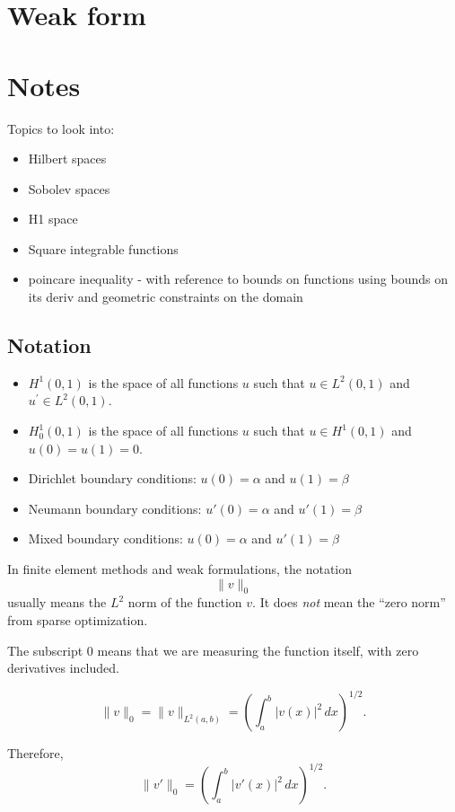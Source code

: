 \documentclass[../main.tex]{subfiles}
\begin{document}
\section{Weak form}

\section{Notes}
Topics to look into:
\begin{itemize}
    \item Hilbert spaces
    \item Sobolev spaces
    \item H1 space
    \item Square integrable functions
    \item poincare inequality - with reference to bounds on functions using bounds on its deriv and geometric constraints on the domain
\end{itemize}

\subsection{Notation}

\begin{itemize}
    \item $H^1(0,1)$ is the space of all functions $u$ such that $u \in L^2(0,1)$ and $u^{\prime} \in L^2(0,1)$.
    \item $H^1_0(0,1)$ is the space of all functions $u$ such that $u \in H^1(0,1)$ and $u(0) = u(1) = 0$.
    \item Dirichlet boundary conditions: $u(0) = \alpha$ and $u(1) = \beta$
    \item Neumann boundary conditions: $u'(0) = \alpha$ and $u'(1) = \beta$
    \item Mixed boundary conditions: $u(0) = \alpha$ and $u'(1) = \beta$
\end{itemize}

In finite element methods and weak formulations, the notation
\[
\|v\|_0
\]
usually means the \(L^2\) norm of the function \(v\). It does \emph{not} mean the ``zero norm'' from sparse optimization.

The subscript \(0\) means that we are measuring the function itself, with zero derivatives included.

\[
\|v\|_0 = \|v\|_{L^2(a,b)}
=
\left( \int_a^b |v(x)|^2 \, dx \right)^{1/2}.
\]

Therefore,
\[
\|v'\|_0
=
\left( \int_a^b |v'(x)|^2 \, dx \right)^{1/2}.
\]
\end{document}
